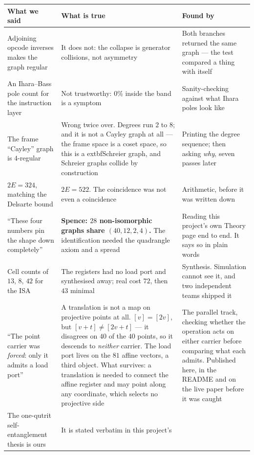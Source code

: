 \documentclass[11pt,a4paper]{article}
\begin{document}
{\footnotesize
\begin{center}
\begin{tabular}{@{}p{4.9cm}p{4.4cm}p{4.8cm}@{}}
\toprule
\textbf{What we said} & \textbf{What is true} & \textbf{Found by}\\
\midrule
Adjoining opcode inverses makes the graph regular & It does not: the collapse is
  generator collisions, not asymmetry & Both branches returned the same graph --- the
  test compared a thing with itself \\
An Ihara--Bass pole count for the instruction layer & Not trustworthy: $0\%$ inside
  the band is a symptom & Sanity-checking against what Ihara poles look like \\
The frame ``Cayley'' graph is $4$-regular & Wrong twice over. Degrees run $2$ to $8$;
  and it is not a Cayley graph at all --- the frame space is a coset space, so this is
  a 	extbf{Schreier} graph, and Schreier graphs collide by construction & Printing the
  degree sequence; then asking \emph{why}, seven passes later \\
$2E = 324$, matching the Delsarte bound & $2E = 522$. The coincidence was not even a
  coincidence & Arithmetic, before it was written down \\
``These four numbers pin the shape down completely'' & \textbf{Spence: $28$ non-isomorphic
  graphs share $(40,12,2,4)$.} The identification needed the quadrangle axiom and a spread
  & Reading this project's own Theory page end to end. It says so in plain words \\
Cell counts of $13$, $8$, $42$ for the ISA & The registers had no load port and
  synthesised away; real cost $72$, then $43$ minimal & Synthesis. Simulation cannot see
  it, and two independent teams shipped it \\
``The point carrier was \emph{forced}: only it admits a load port'' & A translation is not
  a map on projective points at all. $[v] = [2v]$, but $[v+t] \neq [2v+t]$ --- it disagrees
  on $40$ of the $40$ points, so it descends to \emph{neither} carrier. The load port lives
  on the $81$ affine vectors, a third object. What survives: a translation is needed to
  connect the affine register and may point along any coordinate, which selects no
  projective side & The parallel track, checking whether the operation acts on either
  carrier before comparing what each admits. Published here, in the README and on the live
  paper before it was caught \\
The one-qutrit self-entanglement thesis is ours & It is stated verbatim in this project's

\end{tabular}
\end{center}}
\end{document}
